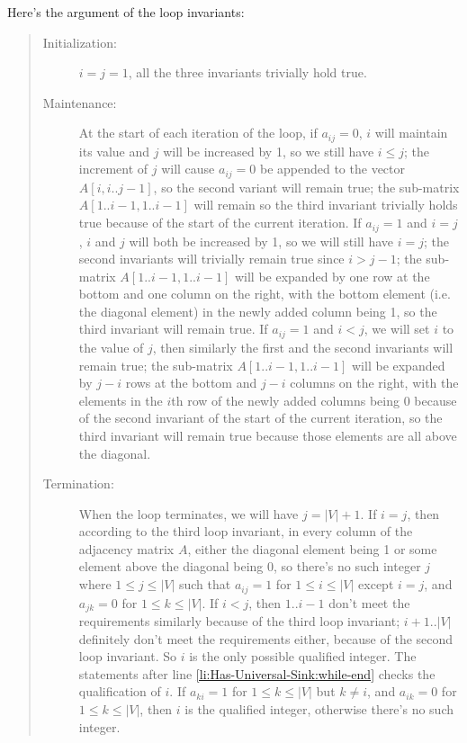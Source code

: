 \documentclass[a4paper, fleqn]{article}
\begin{document}
Here's the argument of the loop invariants:

\begin{quote}
\begin{description}
\item[Initialization:] $i = j = 1$, all the three invariants trivially hold true.

\item[Maintenance:] At the start of each iteration of the \While loop, if $a_{ij} = 0$, $i$ will maintain its value and $j$ will be increased by 1, so we still have $i \leq j$; the increment of $j$ will cause $a_{ij} = 0$ be appended to the vector $A[i, i..j-1]$, so the second variant will remain true; the sub-matrix $A[1..i-1, 1..i-1]$ will remain so the third invariant trivially holds true because of the start of the current iteration. If $a_{ij} = 1$ and $i = j$, $i$ and $j$ will both be increased by 1, so we will still have $i = j$; the second invariants will trivially remain true since $i > j - 1$; the sub-matrix $A[1..i-1, 1..i-1]$ will be expanded by one row at the bottom and one column on the right, with the bottom element (i.e. the diagonal element) in the newly added column being 1, so the third invariant will remain true. If $a_{ij} = 1$ and $i < j$, we will set $i$ to the value of $j$, then similarly the first and the second invariants will remain true; the sub-matrix $A[1..i-1, 1..i-1]$ will be expanded by $j - i$ rows at the bottom and $j - i$ columns on the right, with the elements in the $i$th row of the newly added columns being 0 because of the second invariant of the start of the current iteration, so the third invariant will remain true because those elements are all above the diagonal.

\item[Termination:] When the \While loop terminates, we will have $j = |V| + 1$. If $i = j$, then according to the third loop invariant, in every column of the adjacency matrix $A$, either the diagonal element being 1 or some element above the diagonal being 0, so there's no such integer $j$ where $1 \leq j \leq |V|$ such that $a_{ij} = 1$ for $1 \leq i \leq |V|$ except $i = j$, and $a_{jk} = 0$ for $1 \leq k \leq |V|$. If $i < j$, then $1..i-1$ don't meet the requirements similarly because of the third loop invariant; $i+1..|V|$ definitely don't meet the requirements either, because of the second loop invariant. So $i$ is the only possible qualified integer. The statements after line \ref{li:Has-Universal-Sink:while-end} checks the qualification of $i$. If $a_{ki} = 1$ for $1 \leq k \leq |V|$ but $k \neq i$, and $a_{ik} = 0$ for $1 \leq k \leq |V|$, then $i$ is the qualified integer, otherwise there's no such integer.
\end{description}
\end{quote}
\end{document}
